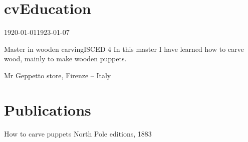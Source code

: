 \documentclass[a4paper]{epasscv} %
\begin{document}
\section{cvEducation}

\begin{timespan}{1920-01-01}{1923-01-07}
  \begin{education}{Master in wooden carving}{ISCED 4}
    In this master I have learned how to carve wood, mainly to make
    wooden puppets.
  \end{education}
  
  \begin{institute}
    Mr Geppetto store, Firenze -- Italy
  \end{institute}
\end{timespan}

\section{\cvPersonalSkills}

\cvmothertongue{\cvEN}
\begin{cvotherlanguages}
\end{cvotherlanguages}



\section{Publications}

  {How to carve puppets}
  {North Pole editions, 1883}

\subsection{\cvCommunicationSkills}
\subsection{\cvOrganisationalSkills}
\subsection{\cvJobSkills}
\subsection{\cvComputerSkills}

\section{\cvAdditionalInfo}
\section{\cvAnnexes}


\cvclosing
\end{document}
